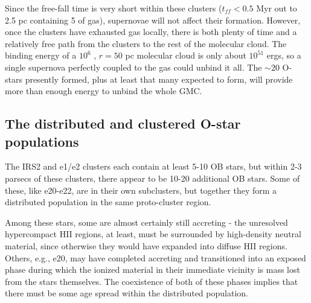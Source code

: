 Since the free-fall time is very short within these clusters ($t_{ff} < 0.5$
Myr out to 2.5 pc containing 5 \msun of gas), supernovae will not affect
their formation.  However, once the clusters have exhausted gas locally, there
is both plenty of time and a relatively free path from the clusters to the rest
of the molecular cloud.  The binding energy of a $10^6$ \msun, $r=50$ pc 
molecular cloud is only about $10^{51}$ ergs, so a single supernova perfectly
coupled to the gas could unbind it all.  The $\sim20$ O-stars presently formed,
plus at least that many expected to form, will provide more than enough energy
to unbind the whole GMC.


\subsection{The distributed and clustered O-star populations}
The IRS2 and e1/e2 clusters each contain at least 5-10 OB stars, but within 2-3
parsecs of these clusters, there appear to be 10-20 additional OB stars.  Some
of these, like e20-e22, are in their own subclusters, but together they form a
distributed population in the same proto-cluster region.

Among these stars, some are almost certainly still accreting - the unresolved
hypercompact HII regions, at least, must be surrounded by high-density neutral
material, since otherwise they would have expanded into diffuse HII regions.
Others, e.g., e20, may have completed accreting and transitioned into an
exposed phase during which the ionized material in their immediate vicinity is
mass lost from the stars themselves.  The coexistence of both of these phases
implies that there must be some age spread within the distributed population.


